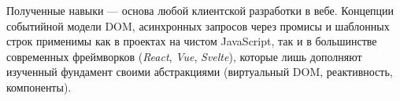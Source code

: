 Полученные навыки --- основа любой клиентской разработки в вебе.
Концепции событийной модели DOM, асинхронных запросов через промисы
и шаблонных строк применимы как в проектах на чистом JavaScript, так
и в большинстве современных фреймворков (\textit{React}, \textit{Vue},
\textit{Svelte}), которые лишь дополняют изученный фундамент своими
абстракциями (виртуальный DOM, реактивность, компоненты).

\endinput
